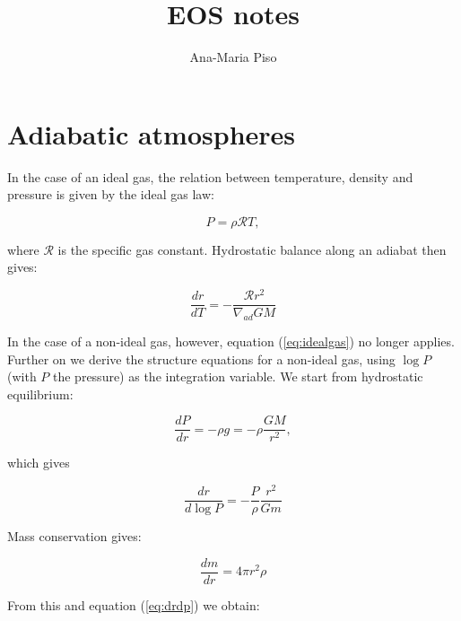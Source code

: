\documentclass[apj]{emulateapj}
\begin{document}
\title{EOS notes}
\author{Ana-Maria Piso}

\section{Adiabatic atmospheres}
\label{adiabatic}


In the case of an ideal gas, the relation between temperature, density and pressure is given by the ideal gas law:

\begin{equation}
\label{eq:idealgas}
P=\rho \mathcal{R} T,
\end{equation}

\noindent where $\mathcal{R}$ is the specific gas constant. Hydrostatic balance along an adiabat then gives:

\begin{equation}
\label{eq:drdtid}
\frac{dr}{dT}=-\frac{\mathcal{R} r^2}{\nabla_{ad} G M}
\end{equation}

In the case of a non-ideal gas, however, equation (\ref{eq:idealgas}) no longer applies. Further on we derive the structure equations for a non-ideal gas, using $\log P$ (with $P$ the pressure) as the integration variable. We start from hydrostatic equilibrium:

\begin{equation}
\label{eq:hydro}
\frac{dP}{dr}=-\rho g=-\rho \frac{G M}{r^2},
\end{equation}

\noindent which gives 

\begin{equation}
\label{eq:drdp}
\frac{dr}{d\log P} = -\frac{P}{\rho} \frac{r^2}{G m}
\end{equation}

Mass conservation gives:

\begin{equation}
\label{eq:mcons}
\frac{dm}{dr} = 4 \pi r^2 \rho
\end{equation}

From this and equation (\ref{eq:drdp}) we obtain:
\end{document}
